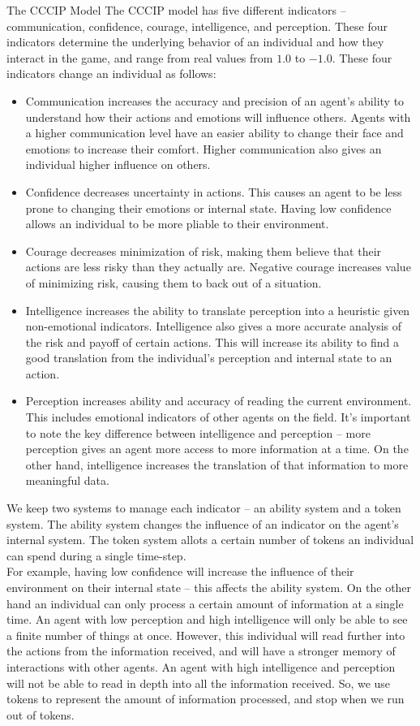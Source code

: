 \documentclass[11pt]{article}
\begin{document}
\begin{section}{The CCCIP Model}
The CCCIP model has five different indicators -- communication, confidence, courage, intelligence, and perception. These four indicators determine the underlying behavior of an individual and how they interact in the game, and range from real values from $1.0$ to $-1.0$. These four indicators change an individual as follows:
\begin{itemize}
\item Communication increases the accuracy and precision of an agent's ability to understand how their actions and emotions will influence others. Agents with a higher communication level have an easier ability to change their face and emotions to increase their comfort. Higher communication also gives an individual higher influence on others. 
\item Confidence decreases uncertainty in actions. This causes an agent to be less prone to changing their emotions or internal state. Having low confidence allows an individual to be more pliable to their environment.
\item Courage decreases minimization of risk, making them believe that their actions are less risky than they actually are. Negative courage increases value of minimizing risk, causing them to back out of a situation.
\item Intelligence increases the ability to translate perception into a heuristic given non-emotional indicators. Intelligence also gives a more accurate analysis of the risk and payoff of certain actions. This will increase its  ability to find a good translation from the individual's perception and internal state to an action. 
\item Perception increases ability and accuracy of reading the current environment. This includes emotional indicators of other agents on the field. It's important to note the key difference between intelligence and perception -- more perception gives an agent more access to more information at a time. On the other hand, intelligence increases the translation of that information to more meaningful data.
\end{itemize}
We keep two systems to manage each indicator -- an ability system and a token system. The ability system changes the influence of an indicator on the agent's internal system. The token system allots a certain number of tokens an individual can spend during a single time-step.\\

For example, having low confidence will increase the influence of their environment on their internal state -- this affects the ability system. On the other hand an individual can only process a certain amount of information at a single time. An agent with low perception and high intelligence will only be able to see a finite number of things at once. However, this individual will read further into the actions from the information received, and will have a stronger memory of interactions with other agents. An agent with high intelligence and perception will not be able to read in depth into all the information received. So, we use tokens to represent the amount of information processed, and stop when we run out of tokens.   
\end{section}
\end{document}
